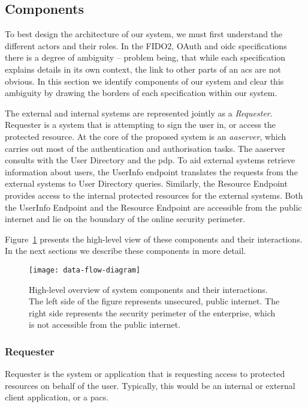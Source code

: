 \subsection{Components}
To best design the architecture of our system, we must first understand the different actors and their roles. In the FIDO2, OAuth and \acrshort{oidc} specifications there is a degree of ambiguity -- problem being, that while each specification explains details in its own context, the link to other parts of an \acrshort{acs} are not obvious. In this section we identify components of our system and clear this ambiguity by drawing the borders of each specification within our system.

The external and internal systems are represented jointly as a \textit{Requester}. Requester is a system that is attempting to sign the user in, or access the protected resource. At the core of the proposed system is an \textit{\acrfull{aaserver}}, which carries out most of the authentication and authorisation tasks. The \acrshort{aaserver} consults with the User Directory and the  \acrfull{pdp}. To aid external systems retrieve information about users, the UserInfo endpoint translates the requests from the external systems to User Directory queries. Similarly, the Resource Endpoint provides access to the internal protected resources for the external systems. Both the UserInfo Endpoint and the Resource Endpoint are accessible from the public internet and lie on the boundary of the online security perimeter.

Figure~\ref{fig:data-flow-diagram} presents the high-level view of these components and their interactions. In the next sections we describe these components in more detail.

\begin{figure}[ht]
    \centering
    \texttt{[image: data-flow-diagram]}
    \caption{High-level overview of system components and their interactions. The left side of the figure represents unsecured, public internet. The right side represents the security perimeter of the enterprise, which is not accessible from the public internet.}
    \label{fig:data-flow-diagram}
\end{figure}

\subsubsection{Requester} 
Requester is the system or application that is requesting access to protected resources on behalf of the user. Typically, this would be an internal or external client application, or a \acrshort{pacs}.

